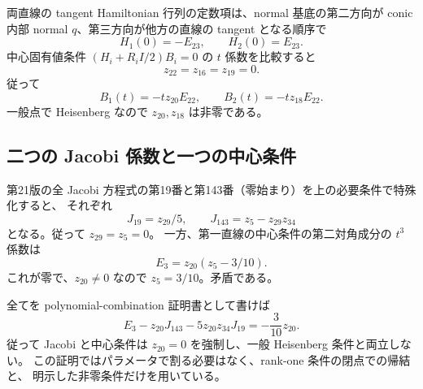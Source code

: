 両直線の tangent Hamiltonian 行列の定数項は、normal 基底の第二方向が
conic 内部 normal $q$、第三方向が他方の直線の tangent となる順序で
\[
H_1(0)=-E_{23},\qquad H_2(0)=E_{23}.
\]
中心固有値条件 $(H_i+R_i I/2)B_i=0$ の $t$ 係数を比較すると
\[
z_{22}=z_{16}=z_{19}=0.
\]
従って
\[
B_1(t)=-tz_{20}E_{22},\qquad B_2(t)=-tz_{18}E_{22}.
\]
一般点で Heisenberg なので $z_{20},z_{18}$ は非零である。

\subsection{二つの Jacobi 係数と一つの中心条件}

第21版の全 Jacobi 方程式の第19番と第143番（零始まり）を上の必要条件で特殊化すると、
それぞれ
\[
J_{19}=z_{29}/5,\qquad J_{143}=z_5-z_{29}z_{34}
\]
となる。従って $z_{29}=z_5=0$。
一方、第一直線の中心条件の第二対角成分の $t^3$ 係数は
\[
E_3=z_{20}(z_5-3/10).
\]
これが零で、$z_{20}\ne0$ なので $z_5=3/10$。矛盾である。

全てを polynomial-combination 証明書として書けば
\[
E_3-z_{20}J_{143}-5z_{20}z_{34}J_{19}
=-\frac3{10}z_{20}.
\]
従って Jacobi と中心条件は $z_{20}=0$ を強制し、一般 Heisenberg 条件と両立しない。
この証明ではパラメータで割る必要はなく、rank-one 条件の閉点での帰結と、
明示した非零条件だけを用いている。
